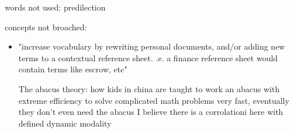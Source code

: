 words not used:
predilection


concepts not broached:

\begin{itemize}
\item
"increase vocabulary by rewriting personal documents, and/or adding new terms to a contextual reference sheet.
.e. a finance reference sheet would contain terms like escrow, etc"

The abacus theory: how kids in china are taught to work an abacus with extreme efficiency
to solve complicated math problems very fast, eventually they don't even need the abacus
I believe there is a corrolationi here with defined dynamic modality
\end{itemize}

